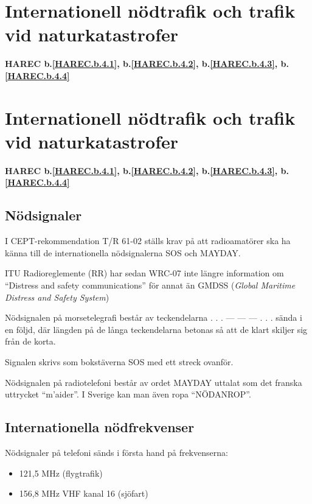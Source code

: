 \section{Internationell nödtrafik och trafik vid naturkatastrofer}
\textbf{
HAREC b.\ref{HAREC.b.4.1}\label{myHAREC.b.4.1},
 b.\ref{HAREC.b.4.2}\label{myHAREC.b.4.2},
 b.\ref{HAREC.b.4.3}\label{myHAREC.b.4.3},
 b.\ref{HAREC.b.4.4}\label{myHAREC.b.4.4}
}

\section{Internationell nödtrafik och trafik vid naturkatastrofer}
\textbf{
	HAREC b.\ref{HAREC.b.4.1}\label{myHAREC.b.4.1},
	b.\ref{HAREC.b.4.2}\label{myHAREC.b.4.2},
	b.\ref{HAREC.b.4.3}\label{myHAREC.b.4.3},
	b.\ref{HAREC.b.4.4}\label{myHAREC.b.4.4}
}

\subsection{Nödsignaler}

I CEPT-rekommendation T/R 61-02 ställs krav på att radioamatörer ska ha känna
till de internationella nödsignalerna SOS och MAYDAY.

ITU Radioreglemente (RR) har sedan WRC-07 inte längre information om
``Distress and safety communications'' för annat än GMDSS (\emph{Global Maritime Distress and Safety System})

Nödsignalen på morsetelegrafi består av teckendelarna . . . --- --- --- . . .
sända i en följd, där längden på de långa teckendelarna betonas så att de klart
skiljer sig från de korta.

Signalen skrivs som bokstäverna SOS med ett streck ovanför.

Nödsignalen på radiotelefoni består av ordet MAYDAY uttalat som det franska
uttrycket ``m'aider''. I Sverige kan man även ropa ``NÖDANROP''.

\subsection{Internationella nödfrekvenser}

Nödsignaler på telefoni sänds i första hand på frekvenserna:
\begin{itemize}
	\item 121,5 MHz (flygtrafik)
	\item 156,8 MHz VHF kanal 16 (sjöfart)
\end{itemize}

